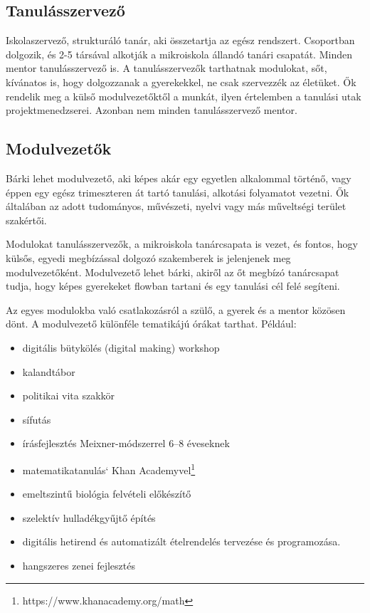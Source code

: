   \subsection{Tanulásszervező}
  Iskolaszervező, strukturáló tanár, aki összetartja az egész rendszert.
  Csoportban dolgozik, és 2-5 társával alkotják a mikroiskola állandó tanári
  csapatát. Minden mentor tanulásszervező is. A tanulásszervezők tarthatnak
  modulokat, sőt, kívánatos is, hogy dolgozzanak a gyerekekkel, ne csak szervezzék az életüket.
  Ők rendelik meg a külső modulvezetőktől a munkát, ilyen értelemben a
  tanulási utak projektmenedzserei. Azonban nem minden tanulásszervező mentor.

  \subsection{Modulvezetők}

  Bárki lehet modulvezető, aki képes akár egy egyetlen alkalommal történő, vagy éppen
  egy egész trimeszteren át tartó tanulási, alkotási folyamatot vezetni. Ők általában
  az adott tudományos, művészeti, nyelvi vagy más műveltségi terület szakértői.

  Modulokat tanulásszervezők, a mikroiskola tanárcsapata is vezet, és fontos, hogy külsős, egyedi megbízással dolgozó szakemberek is jelenjenek meg modulvezetőként. Modulvezető lehet bárki, akiről az őt megbízó tanárcsapat tudja, hogy képes gyerekeket flowban tartani és egy tanulási cél felé segíteni.

  Az egyes modulokba való csatlakozásról a
  szülő, a gyerek és a mentor közösen dönt. A modulvezető különféle tematikájú
  órákat tarthat. Például:
  \begin{itemize}
  \item digitális bütykölés (digital making) workshop

  \item  kalandtábor

  \item  politikai vita szakkör

  \item  sífutás

  \item  írásfejlesztés Meixner-módszerrel 6–8 éveseknek

  \item  matematikatanulás` Khan Academyvel\footnote{https://www.khanacademy.org/math}

  \item emeltszintű biológia felvételi előkészítő
  \item  szelektív hulladékgyűjtő építés

  \item  digitális hetirend és automatizált ételrendelés tervezése és programozása.

  \item hangszeres zenei fejlesztés
\end{itemize}
